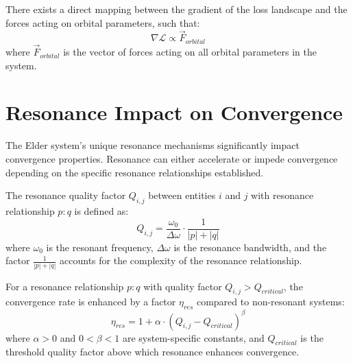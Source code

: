 \begin{corollary}
There exists a direct mapping between the gradient of the loss landscape and the forces acting on orbital parameters, such that:
\begin{equation}
\nabla \mathcal{L} \propto \vec{F}_{orbital}
\end{equation}
where $\vec{F}_{orbital}$ is the vector of forces acting on all orbital parameters in the system.
\end{corollary}

\section{Resonance Impact on Convergence}

The Elder system's unique resonance mechanisms significantly impact convergence properties. Resonance can either accelerate or impede convergence depending on the specific resonance relationships established.

\begin{definition}
The resonance quality factor $Q_{i,j}$ between entities $i$ and $j$ with resonance relationship $p:q$ is defined as:
\begin{equation}
Q_{i,j} = \frac{\omega_{0}}{\Delta \omega} \cdot \frac{1}{|p| + |q|}
\end{equation}
where $\omega_{0}$ is the resonant frequency, $\Delta \omega$ is the resonance bandwidth, and the factor $\frac{1}{|p| + |q|}$ accounts for the complexity of the resonance relationship.
\end{definition}

\begin{theorem}
For a resonance relationship $p:q$ with quality factor $Q_{i,j} > Q_{critical}$, the convergence rate is enhanced by a factor $\eta_{res}$ compared to non-resonant systems:
\begin{equation}
\eta_{res} = 1 + \alpha \cdot (Q_{i,j} - Q_{critical})^{\beta}
\end{equation}
where $\alpha > 0$ and $0 < \beta < 1$ are system-specific constants, and $Q_{critical}$ is the threshold quality factor above which resonance enhances convergence.
\end{theorem}

